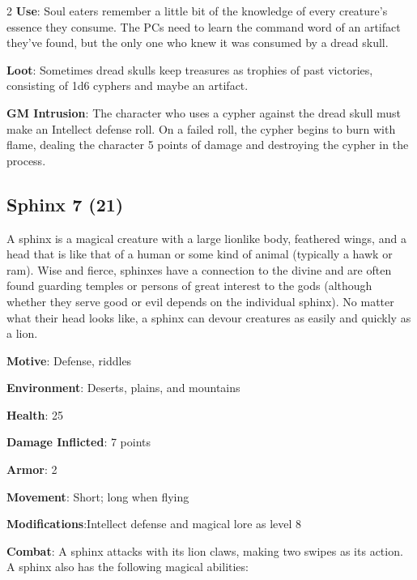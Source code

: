 \begin{multicols}{2}
\textbf{Use}: Soul eaters remember a little bit of the knowledge of every creature’s essence they consume. The PCs need to learn the command word of an artifact they’ve found, but the only one who knew it was consumed by a dread skull. 

\textbf{Loot}: Sometimes dread skulls keep treasures as trophies of past victories, consisting of 1d6 cyphers and maybe an artifact.

\textbf{GM Intrusion}: The character who uses a cypher against the dread skull must make an Intellect defense roll. On a failed roll, the cypher begins to burn with flame, dealing the character 5 points of damage and destroying the cypher in the process.

\subsection{Sphinx 7 (21)}

A sphinx is a magical creature with a large lionlike body, feathered wings, and a head that is like that of a human or some kind of animal (typically a hawk or ram). Wise and fierce, sphinxes have a connection to the divine and are often found guarding temples or persons of great interest to the gods (although whether they serve good or evil depends on the individual sphinx). No matter what their head looks like, a sphinx can devour creatures as easily and quickly as a lion. 

\textbf{Motive}: Defense, riddles 

\textbf{Environment}: Deserts, plains, and mountains 

\textbf{Health}: 25 

\textbf{Damage Inflicted}: 7 points 

\textbf{Armor}: 2 

\textbf{Movement}: Short; long when flying 

\textbf{Modifications}:Intellect defense and magical lore as level 8 

\textbf{Combat}: A sphinx attacks with its lion claws, making two swipes as its action. A sphinx also has the following magical abilities: 


\end{multicols}
